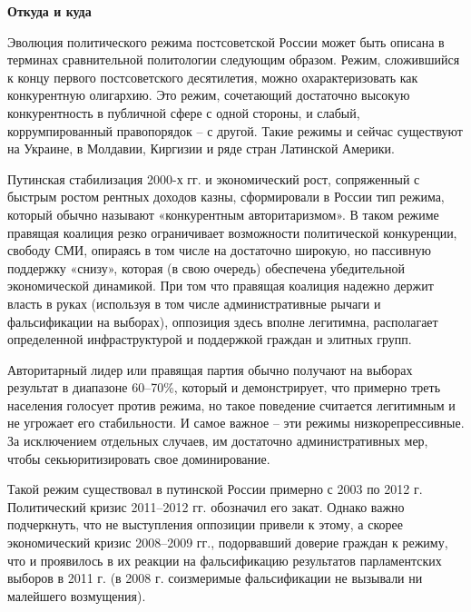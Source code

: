 \textbf{Откуда и куда}

Эволюция политического режима постсоветской России может быть описана в терминах сравнительной политологии следующим образом. Режим, сложившийся к концу первого постсоветского десятилетия, можно охарактеризовать как конкурентную олигархию. Это режим, сочетающий достаточно высокую конкурентность в публичной сфере с одной стороны, и слабый, коррумпированный правопорядок – с другой. Такие режимы и сейчас существуют на Украине, в Молдавии, Киргизии и ряде стран Латинской Америки.

Путинская стабилизация 2000-х гг. и экономический рост, сопряженный с быстрым ростом рентных доходов казны, сформировали в России тип режима, который обычно называют «конкурентным авторитаризмом». В таком режиме правящая коалиция резко ограничивает возможности политической конкуренции, свободу СМИ, опираясь в том числе на достаточно широкую, но пассивную поддержку «снизу», которая (в свою очередь) обеспечена убедительной экономической динамикой. При том что правящая коалиция надежно держит власть в руках (используя в том числе административные рычаги и фальсификации на выборах), оппозиция здесь вполне легитимна, располагает определенной инфраструктурой и поддержкой граждан и элитных групп.

Авторитарный лидер или правящая партия обычно получают на выборах результат в диапазоне 60–70\%, который и демонстрирует, что примерно треть населения голосует против режима, но такое поведение считается легитимным и не угрожает его стабильности. И самое важное – эти режимы низкорепрессивные. За исключением отдельных случаев, им достаточно административных мер, чтобы секьюритизировать свое доминирование.

Такой режим существовал в путинской России примерно с 2003 по 2012 г. Политический кризис 2011–2012 гг. обозначил его закат. Однако важно подчеркнуть, что не выступления оппозиции привели к этому, а скорее экономический кризис 2008–2009 гг., подорвавший доверие граждан к режиму, что и проявилось в их реакции на фальсификацию результатов парламентских выборов в 2011 г. (в 2008 г. соизмеримые фальсификации не вызывали ни малейшего возмущения).

